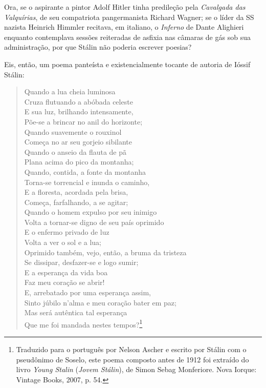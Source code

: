 Ora, se o aspirante a pintor Adolf Hitler tinha predileção pela
\emph{Cavalgada das Valquírias}, de seu compatriota pangermanista
Richard Wagner; se o líder da SS nazista Heinrich Himmler recitava, em
italiano, o \emph{Inferno} de Dante Alighieri enquanto contemplava
sessões reiteradas de asfixia nas câmaras de gás sob sua administração,
por que Stálin não poderia escrever poesias?

Eis, então, um poema panteísta e existencialmente tocante de autoria de
Ióssif Stálin:

\begin{quote}
Quando a lua cheia luminosa~\\
Cruza flutuando a abóbada celeste~\\
E sua luz, brilhando intensamente,~\\
Põe-se a brincar no anil do horizonte;~\\[2\baselineskip]Quando
suavemente o rouxinol~\\
Começa no ar seu gorjeio sibilante~\\
Quando o anseio da flauta de pã~\\
Plana acima do pico da montanha;~\\[2\baselineskip]Quando, contida, a
fonte da montanha~\\
Torna-se torrencial e inunda o caminho,~\\
E a floresta, acordada pela brisa,~\\
Começa, farfalhando, a se agitar;~\\[2\baselineskip]Quando o homem
expulso por seu inimigo~\\
Volta a tornar-se digno de seu país oprimido~\\
E o enfermo privado de luz~\\
Volta a ver o sol e a lua;~\\[2\baselineskip]Oprimido também, vejo,
então, a bruma da tristeza~\\
Se dissipar, desfazer-se e logo sumir;~\\
E a esperança da vida boa~\\
Faz meu coração se abrir!~\\[2\baselineskip]E, arrebatado por uma
esperança assim,~\\
Sinto júbilo n'alma e meu coração bater em paz;~\\
Mas será autêntica tal esperança~\\
Que me foi mandada nestes tempos?\footnote{Traduzido para o português
  por Nelson Ascher e escrito por Stálin com o pseudônimo de Soselo,
  este poema composto antes de 1912 foi extraído do livro \emph{Young
  Stalin} (\emph{Jovem Stálin}), de Simon Sebag Monferiore. Nova Iorque:
  Vintage Books, 2007, p. 54.}
\end{quote}

